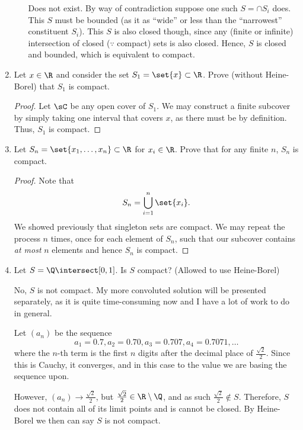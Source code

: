 \documentclass{article}
\begin{document}
\begin{enumerate}
\begin{enumerate}
                Does not exist. By way of contradiction suppose one such $S = \cap S_{i}$ does.
                This $S$ must be bounded (as it as ``wide'' or less than the ``narrowest'' constituent $S_{i}$).
                This $S$ is also closed though, since any (finite or infinite) intersection of closed ($\because$ compact) sets is also closed.
                Hence, $S$ is closed and bounded, which is equivalent to compact.

        \end{enumerate}

  \item Let $x \in \R$ and consider the set $S_{1} = \set{x} \subset \R$. Prove (without Heine-Borel) that $S_{1}$ is compact.

        \begin{proof}
            Let $\sC$ be any open cover of $S_{1}$. We may construct a finite subcover by simply taking one interval that covers $x$,
            as there must be by definition. Thus, $S_{1}$ is compact.
        \end{proof}


  \item Let $S_{n} = \set{x_{1}, \ldots, x_{n}} \subset \R$ for $x_{i} \in \R$. Prove that for any finite $n$, $S_{n}$ is compact.

        \begin{proof}
            Note that
            \[ S_{n} = \bigcup_{i = 1}^{n}\set{x_{i}}. \]
            We showed previously that singleton sets are compact.
            We may repeat the process $n$ times, once for each element of $S_{n}$, such that our subcover contains \emph{at most} $n$ elements
            and hence $S_{n}$ is compact.
        \end{proof}


  \item Let $S = \Q \intersect [0, 1]$. Is $S$ compact? (Allowed to use Heine-Borel)

        No, $S$ is not compact. My more convoluted solution will be presented separately, as it is quite time-consuming now
        and I have a lot of work to do in general.

        Let $(a_{n})$ be the sequence
        \[ a_{1} = 0.7, a_{2} = 0.70, a_{3} = 0.707, a_{4} = 0.7071, \ldots \]
        where the $n$\nobreakdash-th term is the first $n$ digits after the decimal place of $\frac{\sqrt{2}}{2}$.
        Since this is Cauchy, it converges, and in this case to the value we are basing the sequence upon.

        However, $(a_{n}) \to \frac{\sqrt{2}}{2}$, but $\frac{\sqrt{2}}{2} \in \R \setminus \Q$, and as such $\frac{\sqrt{2}}{2} \notin S$. Therefore, $S$ does not contain all of its limit
        points and is cannot be closed. By Heine-Borel we then can say $S$ is not compact.

\end{enumerate}
\end{document}
